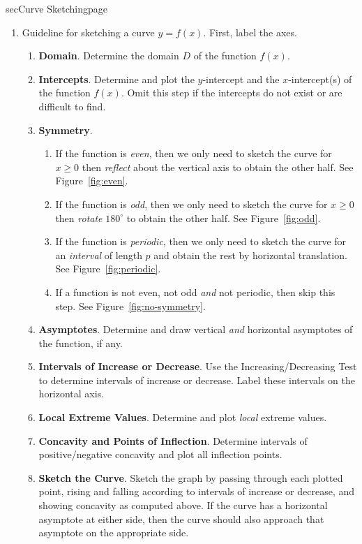 \documentclass[../main]{subfiles}
\begin{document}
\begin{outline}{sec}{Curve Sketching}{page}
\begin{enumerate}
    \item Guideline for sketching a curve \(y = f(x)\). First, label the axes.
      \begin{enumerate}[label=(\Alph*)]
        \item \textbf{Domain}. Determine the domain \(D\) of the function \(f(x)\). 
        \item \textbf{Intercepts}. Determine and plot the \(y\)-intercept and the \(x\)-intercept(s) of the function \(f(x)\). Omit this step if the intercepts do not exist or are difficult to find.
        \item \textbf{Symmetry}. 
          \begin{enumerate}
            \item If the function is \emph{even}, then we only need to sketch the curve for \(x \ge 0\) then \emph{reflect} about the vertical axis to obtain the other half. See Figure~\ref{fig:even}.

            \item If the function is \emph{odd}, then we only need to sketch the curve for \(x \ge 0\) then \emph{rotate} \({180}^{\circ}\) to obtain the other half. See Figure~\ref{fig:odd}.

            \item If the function is \emph{periodic}, then we only need to sketch the curve for an \emph{interval} of length \(p\) and obtain the rest by horizontal translation. See Figure~\ref{fig:periodic}.

            \item[\faIcon{exclamation-triangle}] If a function is not even, not odd \emph{and} not periodic, then skip this step. See Figure~\ref{fig:no-symmetry}.
          \end{enumerate}
        \item \textbf{Asymptotes}. Determine and draw vertical \emph{and} horizontal asymptotes of the function, if any.
        \item \textbf{Intervals of Increase or Decrease}. Use the Increasing/Decreasing Test to determine intervals of increase or decrease. Label these intervals on the horizontal axis.
        \item \textbf{Local Extreme Values}. Determine and plot \emph{local} extreme values.
        \item \textbf{Concavity and Points of Inflection}. Determine intervals of positive/negative concavity and plot all inflection points.
        \item \textbf{Sketch the Curve}. Sketch the graph by passing through each plotted point, rising and falling according to intervals of increase or decrease, and showing concavity as computed above. If the curve has a horizontal asymptote at either side, then the curve should also approach that asymptote on the appropriate side. 
      \end{enumerate}
      

\end{enumerate}
\end{outline}
\end{document}
